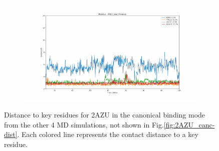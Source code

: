 \begin{figure}[!ht]
\begin{subfigure}{.45\textwidth}
  \end{subfigure}
    \begin{subfigure}{.45\textwidth}
     \centering
     \includegraphics[width=.95\linewidth]{chapter4/2AZU_canc/2AZU_canc-dist_3.pdf}
  \end{subfigure}
\caption{Distance to key residues for 2AZU in the canonical binding mode from the other 4 MD simulations, not shown in Fig.\ref{fig:2AZU_canc-dist}. Each colored line represents the contact distance to a key residue.}
\label{sup:2AZU_canc-dist}
\end{figure}  

